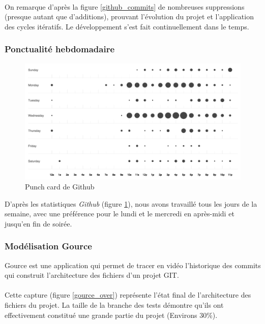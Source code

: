 \paragraph{}
On remarque d'après la figure \ref{github_commits} de nombreuses suppressions (presque autant que d’additions), prouvant l’évolution du projet et l’application des cycles itératifs. Le développement s’est fait continuellement dans le temps.

\subsubsection{Ponctualité hebdomadaire}

\begin{figure}[H]\centering
  \includegraphics[scale=.8]{./img/punchcard.png}
  \caption{Punch card de Github}
  \label{punchcard}
\end{figure}

D’après les statistiques \emph{Github} (figure \ref{punchcard}), nous avons travaillé tous les jours de la semaine, avec une préférence pour le lundi et le mercredi en après-midi et jusqu’en fin de soirée.

\subsubsection{Modélisation Gource}

Gource est une application qui permet de tracer en vidéo l’historique des commits qui construit l’architecture des fichiers d’un projet GIT.

\paragraph{}
Cette capture (figure \ref{gource_over}) représente l’état final de l’architecture des fichiers du projet. La taille de la branche des tests démontre qu'ils ont effectivement constitué une grande partie du projet (Environs 30\%).

